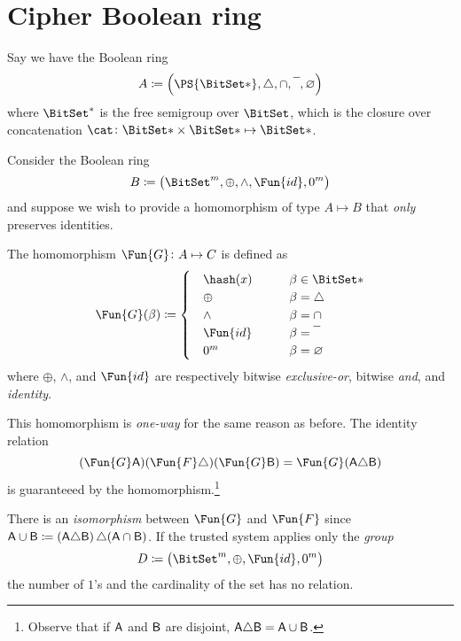 \documentclass[ ../main.tex]{subfiles}
\begin{document}
\section{Cipher Boolean ring}
Say we have the Boolean ring
\begin{equation}
	A \coloneqq \left(\PS{\BitSet*}, \triangle, \SetIntersection, \SetComplement, \EmptySet\right)
\end{equation}
where $\BitSet^*$ is the free semigroup over $\BitSet$, which is the closure over concatenation $\cat \colon {\BitSet*} \times {\BitSet*} \mapsto {\BitSet*}$.

Consider the Boolean ring
\begin{equation}
	B \coloneqq \left(\BitSet^m, \oplus, \land, \Fun{id}, 0^m\right)
\end{equation}
and suppose we wish to provide a homomorphism of type $A \mapsto B$ that \emph{only} preserves identities.

\begin{definition}
	The homomorphism $\Fun{G} \colon A \mapsto C$ is defined as
	\begin{equation}
	\Fun{G}(\beta) \coloneqq
	\begin{cases} 
	\quad \hash(x) 		& \qquad \beta \in {\BitSet*}\\
	\quad \oplus 		& \qquad \beta = \triangle \\
	\quad \land 		& \qquad \beta = \SetIntersection\\
	\quad \Fun{id}		& \qquad \beta = \SetComplement\\
	\quad 0^m			& \qquad \beta = \EmptySet\\
	\end{cases}
	\end{equation}
where $\oplus$, $\land$, and $\Fun{id}$ are respectively bitwise \emph{exclusive-or}, bitwise \emph{and}, and \emph{identity}.
\end{definition}

This homomorphism is \emph{one-way} for the same reason as before.
The identity relation
\begin{equation}
	(\Fun{G} \Set{A}) (\Fun{F} \triangle) (\Fun{G} \Set{B}) = \Fun{G}(\Set{A} \triangle \Set{B})
\end{equation}
is guaranteeed by the homomorphism.\footnote{Observe that if $\Set{A}$ and $\Set{B}$ are disjoint, $\Set{A} \triangle \Set{B} = \Set{A} \SetUnion \Set{B}$.}

There is an \emph{isomorphism} between $\Fun{G}$ and $\Fun{F}$ since $\Set{A} \SetUnion \Set{B} \coloneqq \left(\Set{A} \triangle \Set{B}\right) \triangle (\Set{A} \SetIntersection \Set{B})$.
If the trusted system applies only the \emph{group}
\begin{equation}
	D \coloneqq \left(\BitSet^m, \oplus, \Fun{id}, 0^m\right)
\end{equation}
the number of $1$'s and the cardinality of the set has no relation.
\end{document}
